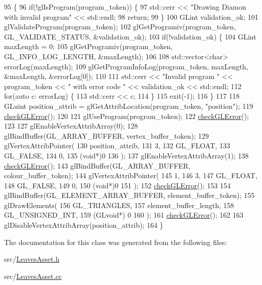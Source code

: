 \begin{DoxyCode}
95                                            \{
96   \textcolor{keywordflow}{if}(!glIsProgram(program\_token)) \{
97     std::cerr << \textcolor{stringliteral}{"Drawing Diamon with invalid program"} << std::endl;
98     \textcolor{keywordflow}{return};
99   \}
100   GLint validation\_ok;
101   glValidateProgram(program\_token);
102   glGetProgramiv(program\_token, GL\_VALIDATE\_STATUS, &validation\_ok);
103   \textcolor{keywordflow}{if}(!validation\_ok) \{
104     GLint maxLength = 0;
105     glGetProgramiv(program\_token, GL\_INFO\_LOG\_LENGTH, &maxLength);
106 
108     std::vector<char> errorLog(maxLength);
109     glGetProgramInfoLog(program\_token, maxLength, &maxLength, &errorLog[0]);
110 
111     std::cerr << \textcolor{stringliteral}{"Invalid program "} << program\_token << \textcolor{stringliteral}{" with error code "} << validation\_ok << std::endl;
112     \textcolor{keywordflow}{for}(\textcolor{keyword}{auto} c: errorLog) \{
113       std::cerr << c;
114     \}
115     exit(-1);
116   \}
117 
118   GLuint position\_attrib = glGetAttribLocation(program\_token, \textcolor{stringliteral}{"position"});
119   \hyperlink{LeavesAsset_8cc_a75f201b0e53e68726854997957322b8d}{checkGLError}();
120 
121   glUseProgram(program\_token);
122   \hyperlink{LeavesAsset_8cc_a75f201b0e53e68726854997957322b8d}{checkGLError}();
123 
127   glEnableVertexAttribArray(0);
128   glBindBuffer(GL\_ARRAY\_BUFFER, vertex\_buffer\_token);
129   glVertexAttribPointer(
130     position\_attrib,        
131     3,        
132     GL\_FLOAT,   
133     GL\_FALSE,   
134     0,        
135     (\textcolor{keywordtype}{void}*)0    
136   );
137   glEnableVertexAttribArray(1);
138   \hyperlink{LeavesAsset_8cc_a75f201b0e53e68726854997957322b8d}{checkGLError}();
143   glBindBuffer(GL\_ARRAY\_BUFFER, colour\_buffer\_token);
144   glVertexAttribPointer(
145     1,        
146     3,        
147     GL\_FLOAT,   
148     GL\_FALSE,   
149     0,        
150     (\textcolor{keywordtype}{void}*)0    
151   );
152   \hyperlink{LeavesAsset_8cc_a75f201b0e53e68726854997957322b8d}{checkGLError}();
153 
154   glBindBuffer(GL\_ELEMENT\_ARRAY\_BUFFER, element\_buffer\_token);
155   glDrawElements(
156     GL\_TRIANGLES,
157     element\_buffer\_length,
158     GL\_UNSIGNED\_INT,
159     (GLvoid*) 0
160   );
161   \hyperlink{LeavesAsset_8cc_a75f201b0e53e68726854997957322b8d}{checkGLError}();
162 
163   glDisableVertexAttribArray(position\_attrib);
164 \}
\end{DoxyCode}


The documentation for this class was generated from the following files\+:\begin{DoxyCompactItemize}
\item 
src/\hyperlink{LeavesAsset_8h}{Leaves\+Asset.\+h}\item 
src/\hyperlink{LeavesAsset_8cc}{Leaves\+Asset.\+cc}\end{DoxyCompactItemize}
